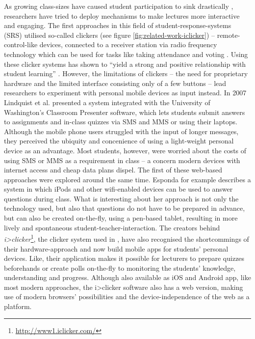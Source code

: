 As growing class-sizes have caused student participation to sink drastically \cite{Bry:Backstage}, researchers have tried to deploy mechanisms to make lectures more interactive and engaging. The first ap\-proa\-ches in this field of student-response-systems (SRS) utilised so-called clickers (see figure \ref{fig:related-work-iclicker}) -- remote-control-like devices, connected to a receiver station via radio frequency technology \cite{cuclickers:faq} which can be used for tasks like taking attendance and voting \cite{Chamillard:StudentResponseSystem}. Using these clicker systems has shown to ``yield a strong and positive relationship with student learning'' \cite{Chamillard:StudentResponseSystem}. However, the limitations of clickers -- the need for proprietary hardware and the limited interface consisting only of a few buttons -- lead researchers to experiment with personal mobile devices as input instead. In 2007 Lindquist et al. \cite{Lindquist:ExploringMobilePhonesActiveLearning} presented a system integrated with the University of Washington's Classroom Presenter software, which lets students submit answers to assignments and in-class quizzes via SMS and MMS or using their laptops. Although the mobile phone users struggled with the input of longer messages, they perceived the ubiquity and concenience of using a light-weight personal device as an advantage. Most students, however, were worried about the costs of using SMS or MMS as a requirement in class -- a concern modern devices with internet access and cheap data plans dispel. The first of these web-based approaches were explored around the same time. Esponda \cite{Esponda:ElectronicVotingOnTheFly} for example describes a system in which iPods and other wifi-enabled devices can be used to answer questions during class. What is interesting about her approach is not only the technology used, but also that questions do not have to be prepared in advance, but can also be created on-the-fly, using a pen-based tablet, resulting in more lively and spontaneous student-teacher-interaction.
The creators behind \emph{i>clicker}\footnote{\url{http://www1.iclicker.com/}}, the clicker system used in \cite{Chamillard:StudentResponseSystem}, have also recognised the shortcommings of their hardware-approach and now build mobile apps for students' personal devices. Like\cite{Esponda:ElectronicVotingOnTheFly}, their application makes it possible for lecturers to prepare quizzes beforehands or create polls on-the-fly to monitoring the students' knowledge, understanding and progress. Although also available as iOS and Android app, like most modern approaches, the i>clicker software also has a web version, making use of modern browsers' possibilities and the device-independence of the web as a platform.
